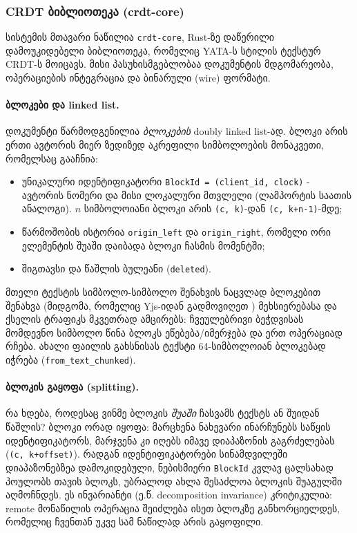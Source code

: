 \subsubsection{CRDT ბიბლიოთეკა (crdt-core)}

სისტემის მთავარი ნაწილია \texttt{crdt-core}, Rust-ზე დაწერილი დამოუკიდებელი
ბიბლიოთეკა, რომელიც YATA-ს სტილის ტექსტურ CRDT-ს მოიცავს. მისი პასუხისმგებლობაა დოკუმენტის
მდგომარეობა, ოპერაციების ინტეგრაცია და ბინარული (wire) ფორმატი.

\paragraph{ბლოკები და linked list.}
დოკუმენტი წარმოდგენილია \emph{ბლოკების} doubly linked list-ად. ბლოკი
არის ერთი ავტორის მიერ ზედიზედ აკრეფილი სიმბოლოების მონაკვეთი, რომელსაც
გააჩნია:
\begin{itemize}[itemsep=0pt]
  \item უნიკალური იდენტიფიკატორი \texttt{BlockId = (client\_id, clock)} -
        ავტორის ნომერი და მისი ლოკალური მთვლელი (ლამპორტის საათის
        ანალოგი).
        $n$ სიმბოლოიანი ბლოკი არის \texttt{(c, k)}-დან \texttt{(c, k+n-1)}-მდე;
  \item წარმოშობის ისტორია \texttt{origin\_left} და
        \texttt{origin\_right}, რომელი ორი ელემენტის შუაში დაიბადა ბლოკი
        ჩასმის მომენტში;
  \item შიგთავსი და წაშლის ბულეანი (\texttt{deleted}).
\end{itemize}

მთელი ტექსტის სიმბოლო-სიმბოლო შენახვის ნაცვლად ბლოკებით შენახვა
(მიდგომა, რომელიც Yjs-იდან გადმოვიღეთ \cite{yjs}) მეხსიერებასა და ქსელის
ტრაფიკს მკვეთრად ამცირებს: ჩვეულებრივი ბეჭდვისას მომდევნო სიმბოლო წინა
ბლოკს ეწებება/იმერჯება და ერთ ოპერაციად რჩება. ახალი ფაილის გახსნისას ტექსტი
64-სიმბოლოიან ბლოკებად იჭრება (\texttt{from\_text\_chunked}).

\paragraph{ბლოკის გაყოფა (splitting).}
რა ხდება, როდესაც ვინმე ბლოკის \emph{შუაში} ჩასვამს ტექსტს ან შუიდან
წაშლის? ბლოკი ორად იყოფა: მარცხენა ნახევარი ინარჩუნებს საწყის
იდენტიფიკატორს, მარჯვენა კი იღებს იმავე დიაპაზონის გაგრძელებას
(\texttt{(c, k+offset)}). რადგან იდენტიფიკატორები სინამდვილეში დიაპაზონებზეა
დამოკიდებული, ნებისმიერი
\texttt{BlockId} კვლავ ცალსახად პოულობს თავის ბლოკს, უბრალოდ ახლა შესაძლოა
ბლოკის შუაგულში აღმოჩნდეს. ეს ინვარიანტი (ე.წ. decomposition invariance)
კრიტიკულია: remote მონაწილის ოპერაცია შეიძლება ისეთ ბლოკზე განხორციელდეს,
რომელიც ჩვენთან უკვე სამ ნაწილად არის გაყოფილი.


